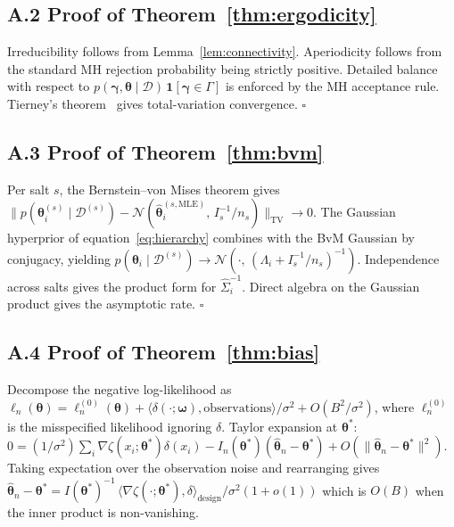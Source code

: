 \documentclass[12pt]{article}
\theoremstyle{plain}
\theoremstyle{definition}
\theoremstyle{remark}
\newcommand{\dotp}[2]{\langle #1, #2 \rangle}
\newcommand{\norm}[1]{\lVert #1 \rVert}
\begin{document}
\subsection*{A.2 Proof of Theorem~\ref{thm:ergodicity}}

Irreducibility follows from Lemma~\ref{lem:connectivity}.  Aperiodicity
follows from the standard MH rejection probability being strictly positive.
Detailed balance with respect to
$p(\boldsymbol\gamma,\boldsymbol\theta\mid\mathcal{D})\,\mathbf{1}[\boldsymbol\gamma\in\Gamma]$
is enforced by the MH acceptance rule.  Tierney's theorem~\citep{Tierney1994}
gives total-variation convergence.
\hfill$\square$

\subsection*{A.3 Proof of Theorem~\ref{thm:bvm}}

Per salt $s$, the Bernstein--von Mises theorem
\citep[Theorem 10.1]{vdVaart1998} gives
$\norm{p(\boldsymbol\theta_i^{(s)}\mid\mathcal{D}^{(s)}) - \mathcal{N}(\hat{\boldsymbol\theta}_i^{(s,\mathrm{MLE})},\, I_s^{-1}/n_s)}_{\mathrm{TV}} \to 0$.
The Gaussian hyperprior of equation~\eqref{eq:hierarchy} combines with the
BvM Gaussian by conjugacy, yielding
$p(\boldsymbol\theta_i\mid\mathcal{D}^{(s)}) \to
\mathcal{N}(\cdot,\,(\Lambda_i + I_s^{-1}/n_s)^{-1})$.  Independence across
salts gives the product form for $\hat\Sigma_i^{-1}$.  Direct algebra on
the Gaussian product gives the asymptotic rate.
\hfill$\square$

\subsection*{A.4 Proof of Theorem~\ref{thm:bias}}

Decompose the negative log-likelihood as
$\ell_n(\boldsymbol\theta) = \ell_n^{(0)}(\boldsymbol\theta) +
\dotp{\delta(\cdot;\boldsymbol\omega)}{\mathrm{observations}}/\sigma^2 +
O(B^2/\sigma^2)$, where $\ell_n^{(0)}$ is the misspecified likelihood
ignoring $\delta$.  Taylor expansion at $\boldsymbol\theta^*$:
$0 = (1/\sigma^2)\sum_i \nabla\zeta(x_i;\boldsymbol\theta^*)\delta(x_i) -
I_n(\boldsymbol\theta^*)(\hat{\boldsymbol\theta}_n -
\boldsymbol\theta^*) + O(\norm{\hat{\boldsymbol\theta}_n -
\boldsymbol\theta^*}^2)$.  Taking expectation over the observation noise
and rearranging gives
$\hat{\boldsymbol\theta}_n - \boldsymbol\theta^* =
I(\boldsymbol\theta^*)^{-1}\,\dotp{\nabla\zeta(\cdot;\boldsymbol\theta^*)}{\delta}_{\mathrm{design}}/\sigma^2 (1 + o(1))$
which is $O(B)$ when the inner product is non-vanishing.
\end{document}
